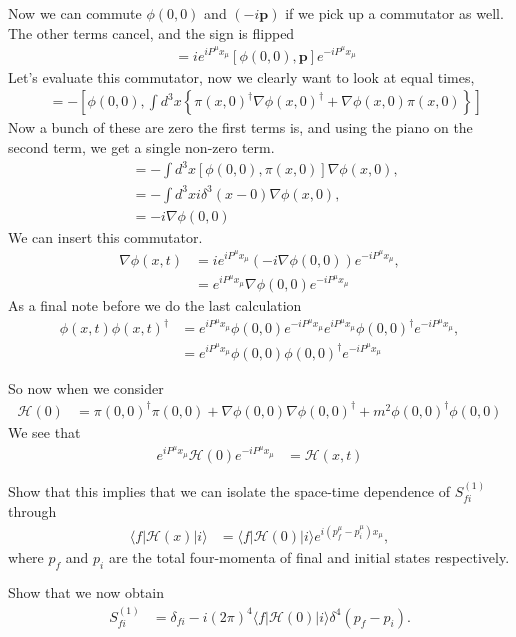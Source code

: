 \documentclass[working, oneside]{../../Preambles/tuftebook}
\begin{document}
\begin{solution}
Now we can commute \( \phi(0, 0) \) and \( (-i \mathbf{p}) \) if we pick up a commutator as well. The other terms cancel, and the sign is flipped
\begin{align*}
&= i e^{i P^\mu x_\mu} [\phi(0, 0), \mathbf{p}] e^{-i P^\mu x_\mu}
\end{align*}
Let's evaluate this commutator, now we clearly want to look at equal times,
\begin{align*}
[\phi(0, 0), \mathbf{p}]
&= - \left[ \phi(0, 0), \int d^3x \left\{ \pi(x, 0)^\dagger \nabla \phi(x, 0)^\dagger + \nabla \phi(x, 0) \pi(x, 0) \right\} \right]
\end{align*}
Now a bunch of these are zero the first terms is, and using the piano on the second term, we get a single non-zero term.
\begin{align*}
&= - \int d^3x \left[ \phi(0, 0), \pi(x, 0) \right] \nabla \phi(x, 0), \\
&= - \int d^3x i \delta^3(x - 0) \nabla \phi(x, 0), \\
&= -i \nabla \phi(0, 0)
\end{align*}
We can insert this commutator.
\begin{align*}
\nabla \phi(x, t)
&= i e^{i P^\mu x_\mu} (-i \nabla \phi(0, 0)) e^{-i P^\mu x_\mu}, \\
&= e^{i P^\mu x_\mu} \nabla \phi(0, 0) e^{-i P^\mu x_\mu}
\end{align*}
As a final note before we do the last calculation
\begin{align*}
\phi(x, t) \phi(x, t)^\dagger
&= e^{i P^\mu x_\mu} \phi(0, 0) e^{-i P^\mu x_\mu} e^{i P^\mu x_\mu} \phi(0, 0)^\dagger e^{-i P^\mu x_\mu}, \\
&= e^{i P^\mu x_\mu} \phi(0, 0) \phi(0, 0)^\dagger e^{-i P^\mu x_\mu}
\end{align*}

So now when we consider
\begin{align*}
\mathcal{H}(0)
&= \pi(0, 0)^\dagger \pi(0, 0) + \nabla \phi(0, 0) \nabla \phi(0, 0)^\dagger + m^2 \phi(0, 0)^\dagger \phi(0, 0)
\end{align*}
We see that
\begin{align*}
e^{i P^\mu x_\mu} \mathcal{H}(0) e^{-i P^\mu x_\mu}
&= \mathcal{H}(x, t)
\end{align*}
\end{solution}
\begin{exercise}[8]
Show that this implies that we can isolate the space-time dependence of \( S_{fi}^{(1)} \) through
\begin{align*}
\langle f | \mathcal{H}(x) | i \rangle
&= \langle f | \mathcal{H}(0) | i \rangle e^{i (p_f^\mu - p_i^\mu) x_\mu}, \tag{54}
\end{align*}
where \( p_f \) and \( p_i \) are the total four-momenta of final and initial states respectively.

Show that we now obtain
\begin{align*}
S_{fi}^{(1)}
&= \delta_{fi} - i (2\pi)^4 \langle f | \mathcal{H}(0) | i \rangle \delta^4(p_f - p_i). \tag{55}
\end{align*}
\end{exercise}
\end{document}
